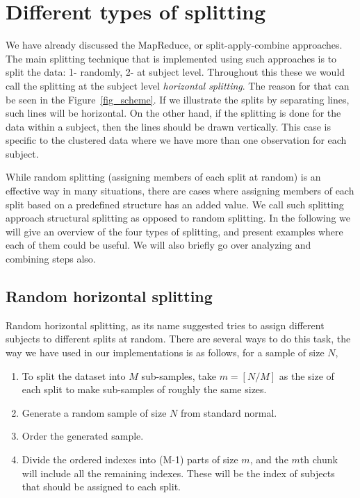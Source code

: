 \documentclass[11pt,a5paper,twoside]{book}
\begin{document}
\section{Different types of splitting}

We have already discussed the MapReduce, or split-apply-combine approaches. The main splitting technique that is implemented using such approaches is to split the data: 1- randomly, 2- at subject level. Throughout this these we would call the splitting at the subject level \emph{horizontal splitting}. The reason for that can be seen in the Figure~\ref{fig_scheme}. If we illustrate the splits by separating lines, such lines will be horizontal. On the other hand, if the splitting is done for the data within a subject, then the lines should be drawn vertically. This case is specific to the clustered data where we have more than one observation for each subject. 

While random splitting (assigning members of each split at random) is an effective way in many situations, there are cases where assigning members of each split based on a predefined structure has an added value. We call such splitting approach structural splitting as opposed to random splitting. In the following we will give an overview of the four types of splitting, and present examples where each of them could be useful. We will also briefly go over analyzing and combining steps also.

\subsection{Random horizontal splitting}    

Random horizontal splitting, as its name suggested tries to assign different subjects to different splits at random. There are several ways to do this task, the way we have used in our implementations is as follows, for a sample of size $N$,

\begin{enumerate}
\item To split the dataset into $M$ sub-samples, take $m = [{N/M}]$ as the size of each split to make sub-samples of roughly the same sizes.
\item Generate a random sample of size $N$ from standard normal.
\item Order the generated sample.
\item Divide the ordered indexes into (M-1) parts of size $m$, and the $m$th chunk will include all the remaining indexes. These will be the index of subjects that should be assigned to each split.
\end{enumerate}
\end{document}
